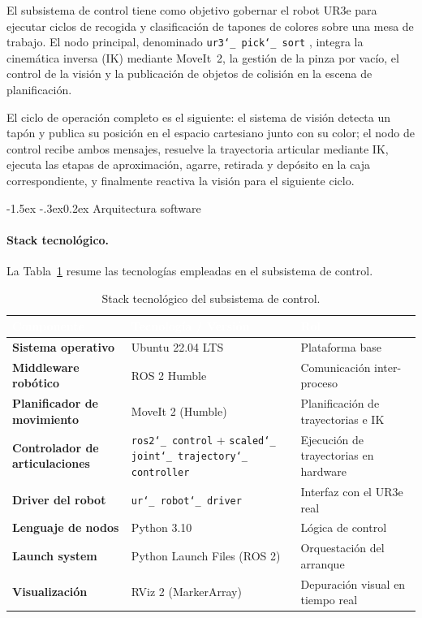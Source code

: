 \documentclass[12pt,a4paper]{article}
\makeatletter
\renewcommand\subsubsection{\@startsection{subsubsection}{3}{\z@}%
  {-1.5ex \@plus -.3ex}{0.2ex}%
  {\normalsize\bfseries\color{MediumBlue}}}
\newcommand{\rowA}{\rowcolor{LightGray}}
\newcommand{\rowB}{\rowcolor{white}}
\newcommand{\code}[1]{%
  \begingroup
  \def\_{\char`_\penalty0 }%
  \def\/{\char`/\penalty0 }%
  \texttt{\small #1}%
  \endgroup}
\makeatother
\begin{document}
El subsistema de control tiene como objetivo gobernar el robot UR3e para ejecutar ciclos de recogida y
clasificación de tapones de colores sobre una mesa de trabajo. El nodo principal, denominado
\code{ur3\_pick\_sort}, integra la cinemática inversa (IK) mediante MoveIt~2, la gestión de la pinza por
vacío, el control de la visión y la publicación de objetos de colisión en la escena de planificación.

El ciclo de operación completo es el siguiente: el sistema de visión detecta un tapón y publica su
posición en el espacio cartesiano junto con su color; el nodo de control recibe ambos mensajes, resuelve
la trayectoria articular mediante IK, ejecuta las etapas de aproximación, agarre, retirada y depósito en
la caja correspondiente, y finalmente reactiva la visión para el siguiente ciclo.

\subsubsection{Arquitectura software}

\paragraph{Stack tecnológico.}
La Tabla~\ref{tab:ctrl-stack} resume las tecnologías empleadas en el subsistema de control.

\begin{table}[H]
\centering
\caption{Stack tecnológico del subsistema de control.}
\label{tab:ctrl-stack}
\small
\renewcommand{\arraystretch}{1.25}
\begin{tabularx}{\textwidth}{|>{\bfseries}l|>{\RaggedRight\arraybackslash}X|>{\RaggedRight\arraybackslash}X|}
  \hline
  \rowcolor{BlueHeader}
  \textcolor{white}{\bfseries Componente} &
  \textcolor{white}{\bfseries Tecnología / Versión} &
  \textcolor{white}{\bfseries Rol} \\
  \hline
  \rowA Sistema operativo & Ubuntu 22.04 LTS & Plataforma base \\
  \rowB Middleware robótico & ROS 2 Humble & Comunicación inter-proceso \\
  \rowA Planificador de movimiento & MoveIt 2 (Humble) & Planificación de trayectorias e IK \\
  \rowB Controlador de articulaciones & \code{ros2\_control} + \code{scaled\_joint\_trajectory\_controller} & Ejecución de trayectorias en hardware \\
  \rowA Driver del robot & \code{ur\_robot\_driver} & Interfaz con el UR3e real \\
  \rowB Lenguaje de nodos & Python 3.10 & Lógica de control \\
  \rowA Launch system & Python Launch Files (ROS 2) & Orquestación del arranque \\
  \rowB Visualización & RViz 2 (MarkerArray) & Depuración visual en tiempo real \\
  \hline
\end{tabularx}
\end{table}
\end{document}
